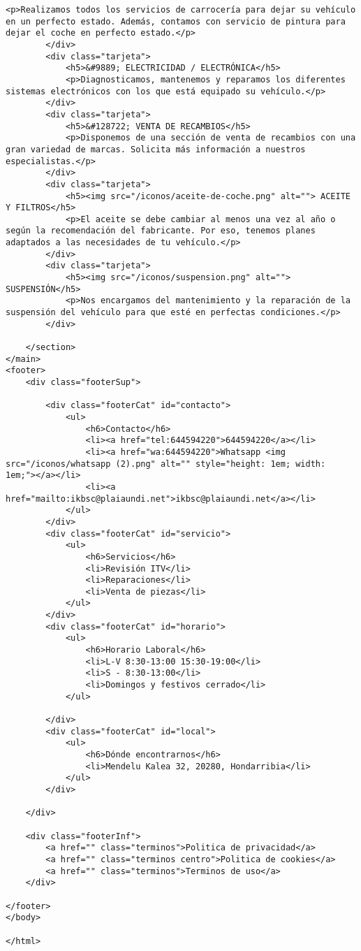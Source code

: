 \begin{lstlisting}[caption=servicios.html (LMSI)]
            <p>Realizamos todos los servicios de carrocería para dejar su vehículo en un perfecto estado. Además, contamos con servicio de pintura para dejar el coche en perfecto estado.</p>
        </div>
        <div class="tarjeta">
            <h5>&#9889; ELECTRICIDAD / ELECTRÓNICA</h5>
            <p>Diagnosticamos, mantenemos y reparamos los diferentes sistemas electrónicos con los que está equipado su vehículo.</p>
        </div>
        <div class="tarjeta">
            <h5>&#128722; VENTA DE RECAMBIOS</h5>
            <p>Disponemos de una sección de venta de recambios con una gran variedad de marcas. Solicita más información a nuestros especialistas.</p>
        </div>
        <div class="tarjeta">
            <h5><img src="/iconos/aceite-de-coche.png" alt=""> ACEITE Y FILTROS</h5>
            <p>El aceite se debe cambiar al menos una vez al año o según la recomendación del fabricante. Por eso, tenemos planes adaptados a las necesidades de tu vehículo.</p>
        </div>
        <div class="tarjeta">
            <h5><img src="/iconos/suspension.png" alt=""> SUSPENSIÓN</h5>
            <p>Nos encargamos del mantenimiento y la reparación de la suspensión del vehículo para que esté en perfectas condiciones.</p>
        </div>

    </section>
</main>
<footer>
    <div class="footerSup">

        <div class="footerCat" id="contacto">
            <ul>
                <h6>Contacto</h6>
                <li><a href="tel:644594220">644594220</a></li>
                <li><a href="wa:644594220">Whatsapp <img src="/iconos/whatsapp (2).png" alt="" style="height: 1em; width: 1em;"></a></li>
                <li><a href="mailto:ikbsc@plaiaundi.net">ikbsc@plaiaundi.net</a></li>
            </ul>
        </div>
        <div class="footerCat" id="servicio">
            <ul>
                <h6>Servicios</h6>
                <li>Revisión ITV</li>
                <li>Reparaciones</li>
                <li>Venta de piezas</li>
            </ul>
        </div>
        <div class="footerCat" id="horario">
            <ul>
                <h6>Horario Laboral</h6>
                <li>L-V 8:30-13:00 15:30-19:00</li>
                <li>S - 8:30-13:00</li>
                <li>Domingos y festivos cerrado</li>
            </ul>

        </div>
        <div class="footerCat" id="local">
            <ul>
                <h6>Dónde encontrarnos</h6>
                <li>Mendelu Kalea 32, 20280, Hondarribia</li>
            </ul>
        </div>

    </div>

    <div class="footerInf">
        <a href="" class="terminos">Politica de privacidad</a>
        <a href="" class="terminos centro">Politica de cookies</a>
        <a href="" class="terminos">Terminos de uso</a>
    </div>

</footer>
</body>

</html>
\end{lstlisting}
